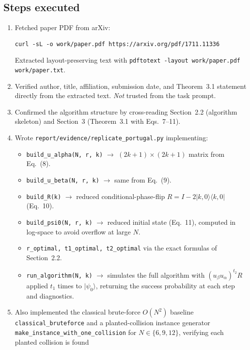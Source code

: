 \documentclass[11pt]{article}
\begin{document}
\subsection{Steps executed}
\begin{enumerate}[leftmargin=*,itemsep=0.2em]
  \item Fetched paper PDF from arXiv:
    \begin{lstlisting}
curl -sL -o work/paper.pdf https://arxiv.org/pdf/1711.11336
    \end{lstlisting}
    Extracted layout-preserving text with
    \verb|pdftotext -layout work/paper.pdf work/paper.txt|.
  \item Verified author, title, affiliation, submission date, and Theorem~3.1
        statement directly from the extracted text. \emph{Not} trusted from
        the task prompt.
  \item Confirmed the algorithm structure by cross-reading Section~2.2
        (algorithm skeleton) and Section~3 (Theorem~3.1 with Eqs.~7--11).
  \item Wrote \texttt{report/evidence/replicate\_portugal.py} implementing:
    \begin{itemize}[nosep]
      \item \verb|build_u_alpha(N, r, k)| $\to$ $(2k{+}1)\times(2k{+}1)$
            matrix from Eq.~(8).
      \item \verb|build_u_beta(N, r, k)| $\to$ same from Eq.~(9).
      \item \verb|build_R(k)| $\to$ reduced conditional-phase-flip
            $R = I - 2|k,0\rangle\langle k,0|$ (Eq.~10).
      \item \verb|build_psi0(N, r, k)| $\to$ reduced initial state (Eq.~11),
            computed in log-space to avoid overflow at large $N$.
      \item \verb|r_optimal, t1_optimal, t2_optimal| via the exact formulas
            of Section~2.2.
      \item \verb|run_algorithm(N, k)| $\to$ simulates the full algorithm
            with $(u_\beta u_\alpha)^{t_2} R$ applied $t_1$ times to
            $|\psi_0\rangle$, returning the success probability at each
            step and diagnostics.
    \end{itemize}
  \item Also implemented the classical brute-force $O(N^2)$ baseline
        \verb|classical_bruteforce| and a planted-collision instance
        generator \verb|make_instance_with_one_collision| for
        $N \in \{6, 9, 12\}$, verifying each planted collision is found

\end{enumerate}
\end{document}
